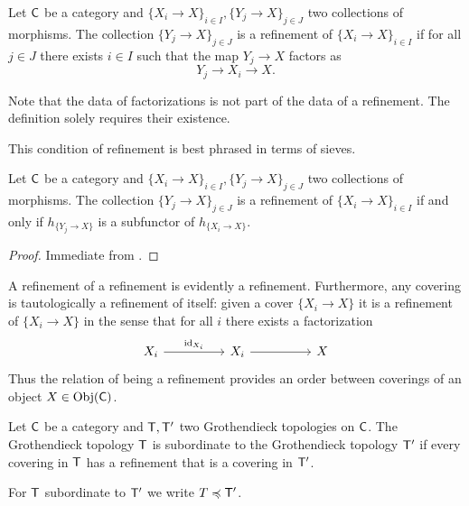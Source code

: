 \begin{definition}[Refinement]\label{def: refinement}
    Let $\mathsf{C}$ be a category and $\{X_{i}\to X\}_{i\in I}, \{Y_{j}\to X\}_{j\in J}$ two collections of morphisms. The collection $\{Y_{j}\to X\}_{j\in J}$ is a refinement of $\{X_{i}\to X\}_{i\in I}$ if for all $j\in J$ there exists $i\in I$ such that the map $Y_{j}\to X$ factors as 
    $$Y_{j}\to X_{i}\to X.$$
\end{definition}
\begin{remark}
    Note that the data of factorizations is not part of the data of a refinement. The definition solely requires their existence. 
\end{remark}
This condition of refinement is best phrased in terms of sieves. 
\begin{proposition}\label{prop: refinement and sieves}
    Let $\mathsf{C}$ be a category and $\{X_{i}\to X\}_{i\in I}, \{Y_{j}\to X\}_{j\in J}$ two collections of morphisms. The collection $\{Y_{j}\to X\}_{j\in J}$ is a refinement of $\{X_{i}\to X\}_{i\in I}$ if and only if $h_{\{Y_{j}\to X\}}$ is a subfunctor of $h_{\{X_{i}\to X\}}$. 
\end{proposition}
\begin{proof}
    Immediate from .
\end{proof}
A refinement of a refinement is evidently a refinement. Furthermore, any covering is tautologically a refinement of itself: given a cover $\{X_{i}\to X\}$ it is a refinement of $\{X_{i}\to X\}$ in the sense that for all $i$ there exists a factorization 
$$%
\begin{tikzcd}
	{X_{i}} && {X_{i}} && X
	\arrow[from=1-3, to=1-5]
	\arrow["{\id_{X_{i}}}", from=1-1, to=1-3]
\end{tikzcd}$$
Thus the relation of being a refinement provides an order between coverings of an object $X\in\mathrm{Obj}(\mathsf{C})$. 
\begin{definition}\label{def: subordinate topologies}
    Let $\mathsf{C}$ be a category and $\mathsf{T},\mathsf{T}'$ two Grothendieck topologies on $\mathsf{C}$. The Grothendieck topology $\mathsf{T}$ is subordinate to the Grothendieck topology $\mathsf{T}'$ if every covering in $\mathsf{T}$ has a refinement that is a covering in $\mathsf{T}'$. 
\end{definition} 
\begin{remark}
    For $\mathsf{T}$ subordinate to $\mathsf{T}'$ we write $T\preccurlyeq\mathsf{T}'$. 
\end{remark}
